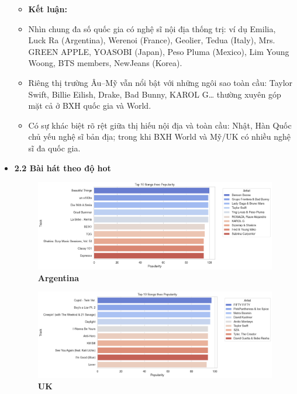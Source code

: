 \begin{itemize}
        \begin{itemize}
            \item \textbf{Kết luận: }
            \item Nhìn chung đa số quốc gia có nghệ sĩ nội địa thống trị: ví dụ Emilia, Luck Ra (Argentina), Werenoi (France), Geolier, Tedua (Italy), Mrs. GREEN APPLE, YOASOBI (Japan), Peso Pluma (Mexico), Lim Young Woong, BTS members, NewJeans (Korea).
            \item Riêng thị trường Âu–Mỹ vẫn nổi bật với những ngôi sao toàn cầu: Taylor Swift, Billie Eilish, Drake, Bad Bunny, KAROL G… thường xuyên góp mặt cả ở BXH quốc gia và World.
            \item Có sự khác biệt rõ rệt giữa thị hiếu nội địa và toàn cầu: Nhật, Hàn Quốc chủ yếu nghệ sĩ bản địa; trong khi BXH World và Mỹ/UK có nhiều nghệ sĩ đa quốc gia.
        \end{itemize}







    \item \textbf{2.2 Bài hát theo độ hot}



    \begin{figure}[H]
        \centering
        \begin{minipage}{0.4\textwidth}
            \centering
            \includegraphics[width=\linewidth]{../graphics/data_top50/figure/2/EDA_argentina.png}
            \\[4pt] {\small \textbf{Argentina}}
        \end{minipage}
        \hfill
        \begin{minipage}{0.4\textwidth}
            \centering
            \includegraphics[width=\linewidth]{../graphics/data_top50/figure/2/EDA_uk.png}
            \\[4pt] {\small \textbf{UK}}
        \end{minipage}


\end{figure}
\end{itemize}
